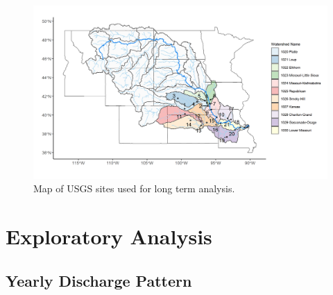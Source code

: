 \documentclass[12pt,]{article}
\makeatletter
\def\maxwidth{\ifdim\Gin@nat@width>\linewidth\linewidth\else\Gin@nat@width\fi}
\makeatother
\begin{document}
\begin{figure}
\includegraphics[width=\maxwidth]{../Figures/site_map} \caption{\label{fig:sitemap} Map of USGS sites used for long term analysis.}\label{fig:sitemap}
\end{figure}

\newpage

\hypertarget{exploratory-analysis}{%
\section{Exploratory Analysis}\label{exploratory-analysis}}

\hypertarget{yearly-discharge-pattern}{%
\subsection{Yearly Discharge Pattern}\label{yearly-discharge-pattern}}
\end{document}
